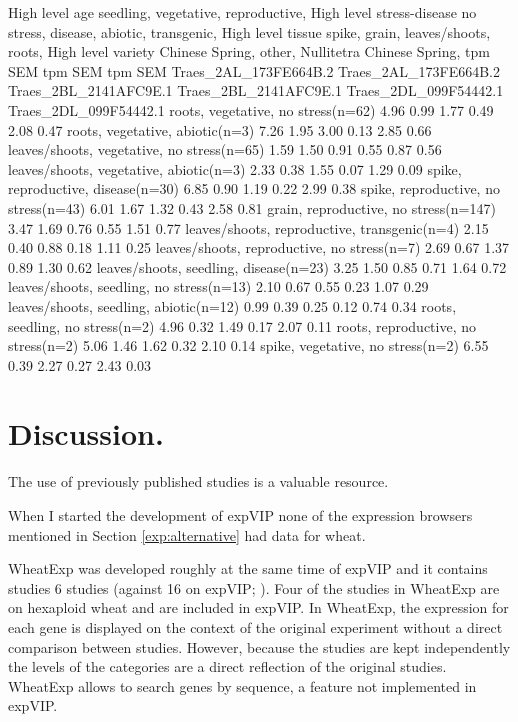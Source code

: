 \begin{landscape}
\begin{code_2}[label=lst:exp:exportSample, caption={[Export data example] Export data example, corresponding to the data plot in Figure \ref{fig:exp:tutorial1}}]
High level age	seedling, vegetative, reproductive, 
High level stress-disease	no stress, disease, abiotic, transgenic, 
High level tissue	spike, grain, leaves/shoots, roots, 
High level variety	Chinese Spring, other, Nullitetra Chinese Spring, 
	tpm	SEM	tpm	SEM	tpm	SEM	
	Traes_2AL_173FE664B.2	Traes_2AL_173FE664B.2	Traes_2BL_2141AFC9E.1	Traes_2BL_2141AFC9E.1	Traes_2DL_099F54442.1	Traes_2DL_099F54442.1	
roots, vegetative, no stress(n=62)	4.96	0.99	1.77	0.49	2.08	0.47
roots, vegetative, abiotic(n=3)	7.26	1.95	3.00	0.13	2.85	0.66
leaves/shoots, vegetative, no stress(n=65)	1.59	1.50	0.91	0.55	0.87	0.56
leaves/shoots, vegetative, abiotic(n=3)	2.33	0.38	1.55	0.07	1.29	0.09
spike, reproductive, disease(n=30)	6.85	0.90	1.19	0.22	2.99	0.38
spike, reproductive, no stress(n=43)	6.01	1.67	1.32	0.43	2.58	0.81
grain, reproductive, no stress(n=147)	3.47	1.69	0.76	0.55	1.51	0.77
leaves/shoots, reproductive, transgenic(n=4)	2.15	0.40	0.88	0.18	1.11	0.25
leaves/shoots, reproductive, no stress(n=7)	2.69	0.67	1.37	0.89	1.30	0.62
leaves/shoots, seedling, disease(n=23)	3.25	1.50	0.85	0.71	1.64	0.72
leaves/shoots, seedling, no stress(n=13)	2.10	0.67	0.55	0.23	1.07	0.29
leaves/shoots, seedling, abiotic(n=12)	0.99	0.39	0.25	0.12	0.74	0.34
roots, seedling, no stress(n=2)	4.96	0.32	1.49	0.17	2.07	0.11
roots, reproductive, no stress(n=2)	5.06	1.46	1.62	0.32	2.10	0.14
spike, vegetative, no stress(n=2)	6.55	0.39	2.27	0.27	2.43	0.03
\end{code_2}
\end{landscape}

\section{Discussion.} 


The use of previously published studies is a valuable resource. 

When I started the development of expVIP none of the expression browsers mentioned in Section \ref{exp:alternative} had data for wheat. 


WheatExp was developed roughly at the same time of expVIP and it contains studies 6 studies (against 16 on expVIP; \citealt{Pearce2015b}). 
Four of the studies in WheatExp are on hexaploid wheat and are included in expVIP. 
In WheatExp, the expression for each gene is displayed on the context of the original experiment without a direct comparison between studies. 
However, because the studies are kept independently the levels of the categories are a direct reflection of the original studies. 
WheatExp allows to search genes by sequence, a feature not implemented in expVIP. 


